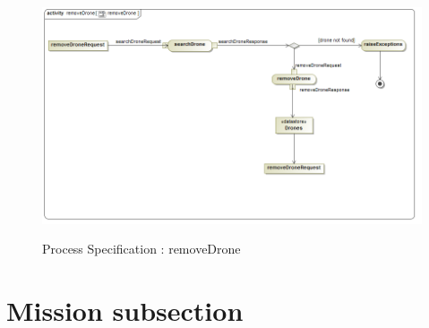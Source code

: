 \documentclass{article}
\begin{document}
		\begin{figure}[H]
			\includegraphics[width=\textwidth]{ps_delete.png}  \\
			\caption{Process Specification : removeDrone}
		\end{figure}
		
	
	
\newpage

\section{Mission subsection}
\end{document}
